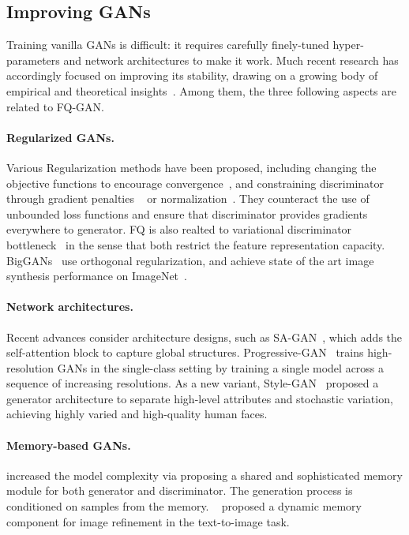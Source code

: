 \documentclass{article}
\begin{document}
\subsection{Improving GANs}
Training vanilla GANs is difficult: it requires carefully finely-tuned hyper-parameters and network architectures to make it work. Much recent research has accordingly focused on improving its stability, drawing on a growing body of empirical and theoretical insights~\cite{nowozin2016f,li2017alice,zhu2017unpaired,fedus2017many}. Among them, the three following aspects are related to FQ-GAN. 
\paragraph{Regularized GANs.} Various Regularization methods have been proposed, including changing the objective functions to encourage convergence~\cite{arjovsky2017wasserstein,mao2017least,mescheder2018training,kodali2017convergence,zhang2019consistency}, and constraining discriminator through gradient penalties ~\cite{gulrajani2017improved} or normalization~\cite{miyato2018spectral}. They counteract the use of unbounded loss functions and ensure that discriminator provides gradients everywhere to generator.
FQ is also realted to variational discriminator bottleneck~\cite{peng2018variational} in the sense that both restrict the feature representation capacity.
BigGANs~\cite{brock2018large} use orthogonal regularization, and achieve  state of the art image synthesis performance on ImageNet~\cite{imagenet_cvpr09}.


\paragraph{Network architectures.} Recent advances consider architecture designs, such as SA-GAN~\cite{zhang2019self}, which adds the self-attention block to capture global structures.  Progressive-GAN~\cite{karras2018progressive} trains high-resolution GANs in the single-class setting by training a single model across a sequence of increasing resolutions. As a new variant, Style-GAN~\cite{karras2019style} proposed a generator architecture to separate high-level attributes and stochastic variation, achieving highly varied and high-quality human faces.

\paragraph{Memory-based GANs.} 
\citet{kim2018memorization} increased the model complexity via proposing a shared and sophisticated memory module for both generator and discriminator. The generation process is conditioned on samples from the memory. ~\citet{zhu2019dm} proposed a dynamic memory component for image refinement in the text-to-image task.
\end{document}
